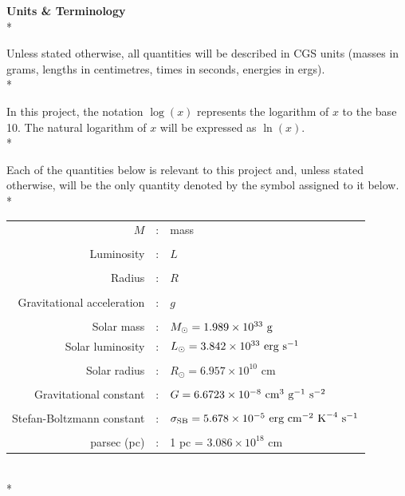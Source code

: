 \documentclass[12pt, a4paper]{report}
\begin{document}

\textbf{Units \& Terminology}\\*

Unless stated otherwise, all quantities will be described in CGS units (masses in grams, lengths in centimetres, times in seconds, energies in ergs). \\*

In this project, the notation $\log(x)$ represents the logarithm of $x$ to the base 10. The natural logarithm of $x$ will be expressed as $\ln(x)$. \\*

Each of the quantities below is relevant to this project and, unless stated otherwise, will be the only quantity denoted by the symbol assigned to it below.\\* 

\begin{tabular}{r@{ }c@{ }l}
$M$ &:& mass\\
\\
Luminosity &:& $L$ \\
\\
Radius &:& $R$ \\
\\
Gravitational acceleration &:& $g$ \\
\\
Solar mass &:& $M_{\odot} = 1.989 \times 10^{33} \textnormal{ g}$ \\
Solar luminosity &:& $L_{\odot} = 3.842 \times 10^{33} \textnormal{ erg s}^{-1}$ \\
\\
Solar radius &:& $R_{\odot} = 6.957 \times 10^{10}$ cm \\
\\
Gravitational constant &:& $G = 6.6723 \times 10^{-8} \textnormal{ cm}^{3} \textnormal{ g}^{-1} \textnormal{ s}^{-2}$ \\
\\
Stefan-Boltzmann constant &:& $\sigma_{\textnormal{SB}} = 5.678 \times 10^{-5} \textnormal{ erg cm}^{-2} \textnormal{ K}^{-4} \textnormal{ s}^{-1}$ \\
\\
parsec (pc) &:& 1 pc = $3.086 \times 10^{18}$ cm
\end{tabular}
\\*
\end{document}
